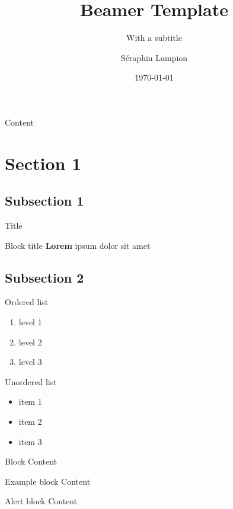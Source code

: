 \documentclass[10pt,svgnames,fragile]{beamer}
\title{\textbf{Beamer Template}}
\subtitle{With a subtitle}
\author{Séraphin Lampion}
\date{\today}
\institute[Université de Lorraine]{Université de Lorraine}
\begin{document}
\maketitle

\begin{frame}{Content}
  \tableofcontents
\end{frame}

\section{Section 1}
\subsection{Subsection 1}

\begin{frame}{Title}
  \begin{block}{Block title}
    \textbf{Lorem} ipsum dolor sit amet
  \end{block}
\end{frame}

\subsection{Subsection 2}

\begin{frame}{Ordered list}
  \begin{enumerate}
  \item level 1
  \item level 2
  \item level 3
  \end{enumerate}
\end{frame}

\begin{frame}{Unordered list}
  \begin{itemize}
  \item item 1
  \item item 2
  \item item 3
  \end{itemize}
\end{frame}

\begin{frame}
  \begin{block}{Block}
    Content
  \end{block}
    \begin{exampleblock}{Example block}
    Content
  \end{exampleblock}
  \begin{alertblock}{Alert block}
    Content
  \end{alertblock}
\end{frame}
\end{document}
